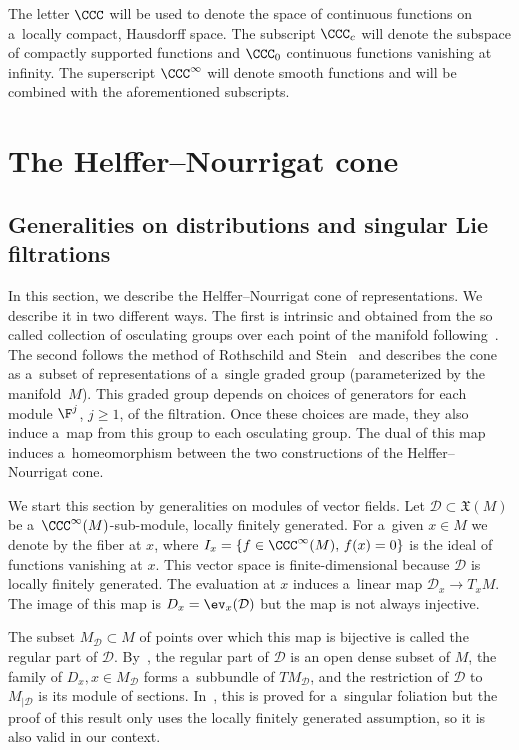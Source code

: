 The letter $\CCC$ will be used to denote the space of continuous functions on a~locally compact, Hausdorff space. The subscript $\CCC_c$ will denote the subspace of compactly supported functions and $\CCC_0$ continuous functions vanishing at infinity. The superscript $\CCC^{\infty}$ will denote smooth functions and will be combined with the aforementioned subscripts.

\section{The Helffer--Nourrigat cone} \label{Section: Helffer--Nourrigat cone}

\subsection{Generalities on distributions and singular Lie filtrations}

In this section, we describe the Helffer--Nourrigat cone of representations. We describe it in two different ways. The first is intrinsic and obtained from the so called collection of osculating groups over each point of the manifold following~\cite{AMYMaximalHypoellipticity}. The second follows the method of Rothschild and Stein~\cite{RothschildStein} and describes the cone as a~subset of representations of a~single graded group (parameterized by the manifold~$M$). This graded group depends on choices of generators for each module $\F^j$, $j\geq 1$, of the filtration. Once these choices are made, they also induce a~map from this group to each osculating group. The dual of this map induces a~homeomorphism between the two constructions of the Helffer--Nourrigat cone.

We start this section by generalities on modules of vector fields. Let $\mathcal{D}\subset \mathfrak{X}(M)$ be a~$\CCC^{\infty}(M)$-sub-module, locally finitely generated. For a~given $x \in M$ we denote by  the fiber at $x$, where $I_x= \{ f\in \CCC^{\infty}(M),\, f(x) = 0\}$ is the ideal of functions vanishing at $x$. This vector space is finite-dimensional because $\mathcal{D}$ is locally finitely generated. The evaluation at $x$ induces a~linear map $\mathcal{D}_x \to T_xM$. The image of this map is $D_x = \ev_x(\mathcal{D})$ but the map is not always injective.

The subset $M_{\mathcal{D}} \subset M$ of points over which this map is bijective is called the regular part of $\mathcal{D}$. By~\cite[Proposition~1.5]{AndroulidakisSkandalisHolonomy}, the regular part of $\mathcal{D}$ is an open dense subset of $M$, the family of $D_x, x\in M_{\mathcal{D}}$ forms a~subbundle of $ TM_{\mathcal{D}}$, and the restriction of $\mathcal{D}$ to $M_{|\mathcal{D}}$ is its module of sections. In~\cite{AndroulidakisSkandalisHolonomy}, this is proved for a~singular foliation but the proof of this result only uses the locally finitely generated assumption, so it is also valid in our context.

